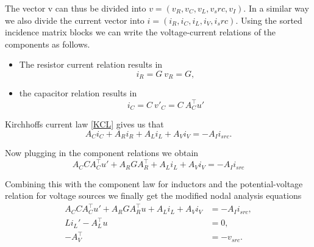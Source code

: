The vector v can thus be divided into $v = (v_R, v_C, v_L, v_src, v_I)$. In a similar way we also divide the current vector into $i = (i_R, i_C, i_L, i_V, i_src)$. Using the sorted incidence matrix blocks we can write the voltage-current relations of the components as follows.
\begin{itemize}
	\item The resistor current relation results in
	\begin{displaymath}
		i_R = G \ v_R = G,
	\end{displaymath}
	\item the capacitor relation results in
	\begin{displaymath}
		i_C = C \ v'_C = C \ A_C^\top u'
	\end{displaymath}
\end{itemize}

Kirchhoffs current law \eqref{KCL} gives us that
\begin{displaymath}
	A_C i_C + A_R i_R + A_L i_L + A_V i_V = -A_I i_{src}.
\end{displaymath}

Now plugging in the component relations we obtain
\begin{displaymath}
	A_C C A_C^\top u' + A_R G A_R^\top + A_L i_L + A_V i_V = -A_I i_{src}
 \end{displaymath}

Combining this with the component law for inductors and the potential-voltage relation for voltage sources we finally get the modified nodal analysis equations
\begin{displaymath}
	\begin{aligned}
		A_C C A_C^\top u' + A_R G A_R^\top u + A_L i_L + A_V i_V &= - A_I i_{src} , \\
		L i_L'	- A_L^\top u &= 0 , \\
		-A_V^\top &=  -v_{src}.
	\end{aligned}	
\end{displaymath}

